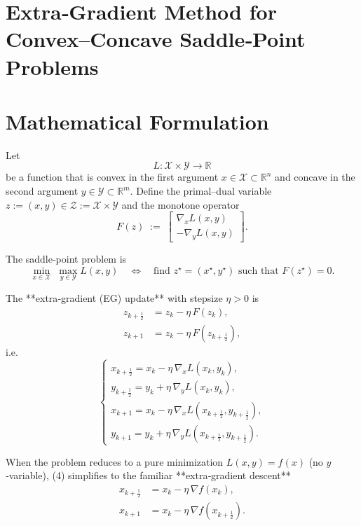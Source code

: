 \documentclass{article}
\newcommand{\R}{\mathbb{R}}
\begin{document}
\section*{Extra‑Gradient Method for Convex–Concave Saddle‑Point Problems}

\section*{Mathematical Formulation}
Let 
\[
L:\mathcal{X}\times\mathcal{Y}\rightarrow\R
\]
be a function that is convex in the first argument $x\in\mathcal{X}\subset\R^{n}$ and concave in the second argument $y\in\mathcal{Y}\subset\R^{m}$.  
Define the primal–dual variable $z:=(x,y)\in\mathcal{Z}:=\mathcal{X}\times\mathcal{Y}$ and the monotone operator
\[
F(z)\;:=\;
\begin{bmatrix}
\nabla_{x}L(x,y)\\[2mm]
-\nabla_{y}L(x,y)
\end{bmatrix}.
\tag{1}
\]

The saddle‑point problem is
\[
\min_{x\in\mathcal{X}}\;\max_{y\in\mathcal{Y}} L(x,y)
\quad\Longleftrightarrow\quad
\text{find }z^{\star}=(x^{\star},y^{\star})\text{ such that }F(z^{\star})=0.
\tag{2}
\]

The **extra‑gradient (EG) update** with stepsize $\eta>0$ is
\[
\begin{aligned}
z_{k+\frac12}&=z_{k}-\eta\,F(z_{k}),\\[1mm]
z_{k+1}&=z_{k}-\eta\,F(z_{k+\frac12}),
\end{aligned}
\tag{3}
\]
i.e.
\[
\begin{cases}
x_{k+\frac12}=x_{k}-\eta\,\nabla_{x}L(x_{k},y_{k}),\\[1mm]
y_{k+\frac12}=y_{k}+\eta\,\nabla_{y}L(x_{k},y_{k}),\\[2mm]
x_{k+1}=x_{k}-\eta\,\nabla_{x}L(x_{k+\frac12},y_{k+\frac12}),\\[1mm]
y_{k+1}=y_{k}+\eta\,\nabla_{y}L(x_{k+\frac12},y_{k+\frac12}).
\end{cases}
\tag{4}
\]

When the problem reduces to a pure minimization $L(x,y)=f(x)$ (no $y$‑variable), (4) simplifies to the familiar **extra‑gradient descent**
\[
\begin{aligned}
x_{k+\frac12}&=x_{k}-\eta\,\nabla f(x_{k}),\\
x_{k+1}&=x_{k}-\eta\,\nabla f(x_{k+\frac12}).
\end{aligned}
\tag{5}
\]
\end{document}
